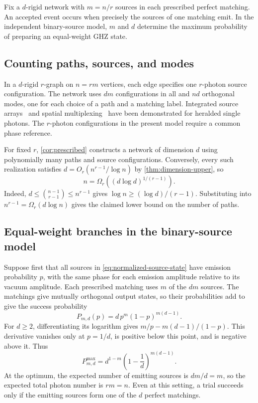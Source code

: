 \documentclass[10pt]{article}
\numberwithin{equation}{section}
\theoremstyle{definition}
\begin{document}
Fix a $d$-rigid network with $m=n/r$ sources in each prescribed perfect matching. An accepted event occurs when precisely the sources of one matching emit. In the independent binary-source model, $m$ and $d$ determine the maximum probability of preparing an equal-weight GHZ state.

\subsection{Counting paths, sources, and modes}

In a $d$-rigid $r$-graph on $n=rm$ vertices, each edge specifies one $r$-photon source configuration. The network uses $dm$ configurations in all and $nd$ orthogonal modes, one for each choice of a path and a matching label. Integrated source arrays~\cite{SpringEtAl2017} and spatial multiplexing~\cite{CollinsEtAl2013} have been demonstrated for heralded single photons. The $r$-photon configurations in the present model require a common phase reference.

For fixed $r$, \cref{cor:prescribed} constructs a network of dimension $d$ using polynomially many paths and source configurations. Conversely, every such realization satisfies $d=O_r(n^{r-1}/\log n)$ by \cref{thm:dimension-upper}, so
\[
 n=\Omega_r\!\left((d\log d)^{1/(r-1)}\right).
\]
Indeed, $d\le\binom{n-1}{r-1}\le n^{r-1}$ gives $\log n\ge(\log d)/(r-1)$. Substituting into $n^{r-1}=\Omega_r(d\log n)$ gives the claimed lower bound on the number of paths.

\subsection{Equal-weight branches in the binary-source model}

Suppose first that all sources in \cref{eq:normalized-source-state} have emission probability $p$, with the same phase for each emission amplitude relative to its vacuum amplitude. Each prescribed matching uses $m$ of the $dm$ sources. The matchings give mutually orthogonal output states, so their probabilities add to give the success probability
\begin{equation}
 P_{m,d}(p)=d\,p^m(1-p)^{m(d-1)}.
 \label{eq:binary-success}
\end{equation}
For $d\ge2$, differentiating its logarithm gives $m/p-m(d-1)/(1-p)$. This derivative vanishes only at $p=1/d$, is positive below this point, and is negative above it. Thus
\begin{equation}
 P_{m,d}^{\max}=d^{1-m}\left(1-\frac1d\right)^{m(d-1)}.
 \label{eq:binary-success-optimal}
\end{equation}
At the optimum, the expected number of emitting sources is $dm/d=m$, so the expected total photon number is $rm=n$. Even at this setting, a trial succeeds only if the emitting sources form one of the $d$ perfect matchings.
\end{document}
